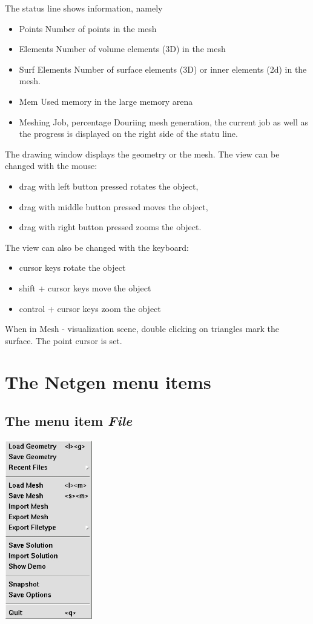 \documentclass[12pt]{book}
\begin{document}
The status line shows information, namely
\begin{itemize}
\item Points \newline
Number of points in the mesh
\item Elements \newline
Number of volume elements (3D) in the mesh
\item Surf Elements \newline
Number of surface elements (3D) or inner elements (2d) in the mesh.
\item Mem \newline
Used memory in the large memory arena
\item Meshing Job, percentage
Douriing mesh generation, the current job as well as the progress is displayed on the 
right side of the statu line.
\end{itemize}

The drawing window displays the geometry or the mesh. The view
can be changed with the mouse:
\begin{itemize}
\item drag with left button pressed rotates the object,
\item drag with middle button pressed moves the object,
\item drag with right button pressed zooms the object.
\end{itemize}
The view can also be changed with the keyboard:
\begin{itemize}
\item cursor keys rotate the object
\item shift + cursor keys move the object
\item control + cursor keys zoom the object
\end{itemize}

When in Mesh - visualization scene, double clicking on triangles mark the
surface. The point cursor is set.

\section{The Netgen menu items}
\label{sec_menuitems}
\subsection{The menu item {\em File}}
\includegraphics[height=7.8cm]{pictures/menufile} 
\end{document}
